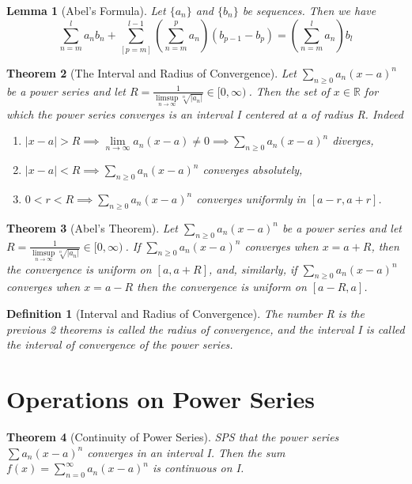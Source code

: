\documentclass[11pt, oneside]{book}
\theoremstyle{break}
\newtheorem{thm}{Theorem}[section]
\newtheorem{lemma}[thm]{Lemma}
\newtheorem{defn}{Definition}[section]
\newcommand{\bb}[1]{\mathbb{#1}}		%
\begin{document}
\begin{lemma}[Abel's Formula]
	Let $\{a_n\}$ and $\{b_n\}$ be sequences. Then we have
	\[
		\sum_{n = m}^{l} a_n b_n + \sum_{[p = m]}^{l - 1} \left( \sum_{n = m}^{p} a_n \right) (b_{p -1} - b_p) = \left(\sum_{n = m}^{l} a_n \right) b_l
	\]
\end{lemma}

\begin{thm}[The Interval and Radius of Convergence]
	Let $\sum\limits_{n \geq 0} a_n (x - a)^n$ be a power series and let $R = \frac{1}{ \limsup\limits_{n \to \infty} \sqrt[n]{|a_n|} } \in [0, \infty)\ $. Then the set of $x \in \bb{R}$ for which the power series converges is an interval I centered at a of radius R. Indeed
	\begin{enumerate}
		\item $|x - a| > R \implies \lim\limits_{n \to \infty} a_n (x - a) \neq 0 \implies \sum\limits_{n \geq 0} a_n (x - a)^n$ diverges,
		\item $|x - a| < R \implies \sum\limits_{n \geq 0} a_n (x - a)^n$ converges absolutely,
		\item $0 < r < R \implies \sum\limits_{n \geq 0} a_n (x - a)^n$ converges uniformly in $[a - r, a + r]$.
	\end{enumerate}
\end{thm}

\begin{thm}[Abel's Theorem]
	Let $\sum\limits_{n \geq 0} a_n (x - a)^n$ be a power series and let $R = \frac{1}{ \limsup\limits_{n \to \infty} \sqrt[n]{|a_n|} } \in [0, \infty)\ $. If $\sum_{n \geq 0} a_n (x - a)^n$ converges when $x = a + R$, then the convergence is uniform on $[a, a + R]$, and, similarly, if $\sum_{n \geq 0} a_n (x - a)^n$ converges when $x = a - R$ then the convergence is uniform on $[a - R, a]$.
\end{thm}

\begin{defn}[Interval and Radius of Convergence]
	The number R is the previous 2 theorems is called the radius of convergence, and the interval I is called the interval of convergence of the power series.
\end{defn}


\section{Operations on Power Series}

\begin{thm}[Continuity of Power Series]
	SPS that the power series $\sum a_n (x - a)^n$ converges in an interval I. Then the sum $f(x) = \sum_{n = 0}^{\infty} a_n (x - a)^n$ is continuous on I.
\end{thm}
\end{document}
